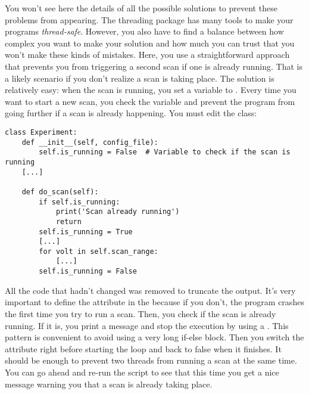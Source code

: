 You won't see here the details of all the possible solutions to prevent these problems from appearing. The threading package has many tools to make your programs \emph{thread-safe}. However, you also have to find a balance between how complex you want to make your solution and how much you can trust that you won't make these kinds of mistakes. Here, you use a straightforward approach that prevents you from triggering a second scan if one is already running. That is a likely scenario if you don't realize a scan is taking place. The solution is relatively easy: when the scan is running, you set a variable to . Every time you want to start a new scan, you check the variable and prevent the program from going further if a scan is already happening. You must edit the  class:

\begin{verbatim}
class Experiment:
    def __init__(self, config_file):
        self.is_running = False  # Variable to check if the scan is running
    [...]

    def do_scan(self):
        if self.is_running:
            print('Scan already running')
            return
        self.is_running = True
        [...]
        for volt in self.scan_range:
            [...]
        self.is_running = False
\end{verbatim}

All the code that hadn't changed was removed to truncate the output. It's very important to define the  attribute in the  because if you don't, the program crashes the first time you try to run a scan. Then, you check if the scan is already running. If it is, you print a message and stop the execution by using a . This pattern is convenient to avoid using a very long if-else block. Then you switch the attribute right before starting the loop and back to false when it finishes. It should be enough to prevent two threads from running a scan at the same time. You can go ahead and re-run the script to see that this time you get a nice message warning you that a scan is already taking place.


